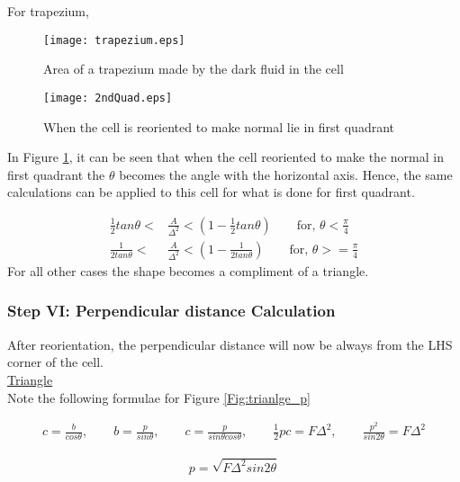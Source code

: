 \underline{}{For trapezium},\\

\begin{figure}%
\centering
\texttt{[image: trapezium.eps]}
\caption{Area of a trapezium made by the dark fluid in the cell}
\end{figure}

\begin{figure}
 \centering
 \texttt{[image: 2ndQuad.eps]}
 \caption{When the cell is reoriented to make normal lie in first quadrant}
 \label{Fig:reorientation}
\end{figure}

In Figure \ref{Fig:reorientation}, it can be seen that when the cell reoriented to make the normal in first quadrant the $\theta$ becomes the angle with the horizontal axis.
Hence, the same calculations can be applied to this cell for what is done for first quadrant. 

\begin{equation*}
\boxed { \begin{align}
 \frac{1}{2} tan\theta <& \frac{A}{\Delta^2}< \left(1-\frac{1}{2} tan\theta\right)  \qquad \text{for, } \theta < \frac{\pi}{4} \nonumber	\\    
   \frac{1}{2tan\theta} <&   \frac{A}{\Delta^2}< \left(1-\frac{1}{2tan\theta}\right) \qquad \text{for, }  \theta >= \frac{\pi}{4}	
   \end{align}}
\end{equation*}
For all other cases the shape becomes a compliment of a triangle.

\subsubsection{Step VI: Perpendicular distance Calculation }
After reorientation, the perpendicular distance will now be always from the LHS corner of the cell.\\
\underline{Triangle}\\
Note the following formulae for Figure \ref{Fig:trianlge_p}

\begin{eqnarray*}
c=\frac{b}{cos\theta},
\qquad b=\frac{p}{sin\theta},  
\qquad  c=\frac{p}{sin\theta cos\theta},
\qquad   \frac{1}{2}pc=F\Delta^2,
\qquad  \frac{p^2}{sin2\theta}=F\Delta^2 \nonumber
\end{eqnarray*}

\begin{equation*}
\boxed{ \begin{align}
  p=\sqrt{F\Delta^2sin2\theta}
  \end{align} }
\end{equation*}
  
